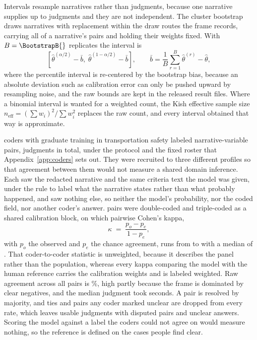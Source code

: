 Intervals resample narratives rather than judgments, because one narrative supplies up to
\FrontierNVars{} judgments and they are not independent. The cluster bootstrap draws narratives
with replacement within the \DesignNStrata{} draw routes the frame records, carrying all of a
narrative's pairs and holding their weights fixed. With $B = \BootstrapB{}$ replicates the
interval is
\begin{equation}
\left[\hat{\theta}^{(\alpha/2)} - \bar{b},\; \hat{\theta}^{(1-\alpha/2)} - \bar{b}\right],
\qquad \bar{b} = \frac{1}{B}\sum_{r=1}^{B} \hat{\theta}^{(r)} - \hat{\theta},
\label{eq:htvar}
\end{equation}
where the percentile interval is re-centered by the bootstrap bias, because an absolute
deviation such as calibration error can only be pushed upward by resampling noise, and the raw
bounds are kept in the released result files. Where a binomial interval is wanted for a weighted
count, the Kish effective sample size $n_{\mathrm{eff}} = (\sum w_i)^2 / \sum w_i^2$ replaces
the raw count, and every interval obtained that way is approximate.

\CoderN{} coders with graduate training in transportation safety labeled \CoderNPairs{}
narrative-variable pairs, \CoderNAnswers{} judgments in total, under the protocol and the fixed
roster that Appendix~\ref{app:coders} sets out. They were recruited to three different profiles
so that agreement between them would not measure a shared domain inference. Each saw the
redacted narrative and the same criteria text the model was given, under the rule to label what
the narrative states rather than what probably happened, and saw nothing else, so neither the
model's probability, nor the coded field, nor another coder's answer. \CoderNDouble{} pairs
were double-coded and
\CoderNCalib{} triple-coded as a shared calibration block, on which pairwise Cohen's kappa,
\begin{equation}
\kappa \;=\; \frac{p_o - p_e}{1 - p_e},
\label{eq:kappa}
\end{equation}
with $p_o$ the observed and $p_e$ the chance agreement, runs from \CoderKappaMin{} to
\CoderKappaMax{} with a median of \CoderKappaMedian{}. That coder-to-coder statistic is
unweighted, because it describes the panel rather than the population, whereas every kappa
comparing the model with the human reference carries the calibration weights and is labeled
weighted. Raw agreement across all pairs is \CoderAgreement\%, high partly because the frame is
dominated by clear negatives, and the median judgment took \CoderMedianSec{} seconds. A pair is
resolved by majority, and ties and pairs any coder marked unclear are dropped from every rate,
which leaves \GoldNUsable{} usable judgments with \GoldNDisputed{} disputed pairs and
\CoderNUnclear{} unclear answers. Scoring the model against a label the coders could not agree
on would measure nothing, so the reference is defined on the cases people find clear.

